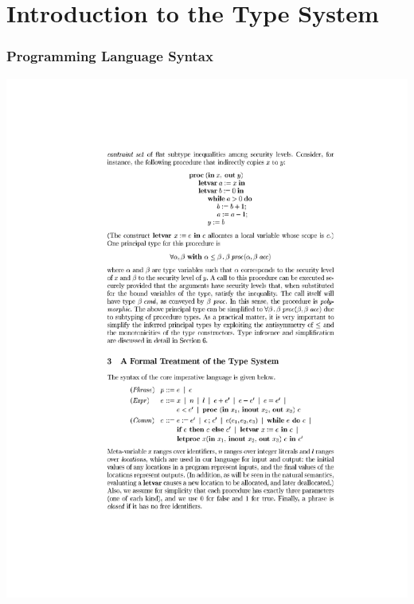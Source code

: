 \documentclass{beamer}
\begin{document}
\section{Introduction to the Type System}

\begin{frame}[fragile]
\frametitle{Programming Language Syntax}

\begin{center}
\includegraphics[scale=1.0]{figures/languagesyntax}
\end{center}

\end{frame}
\end{document}

